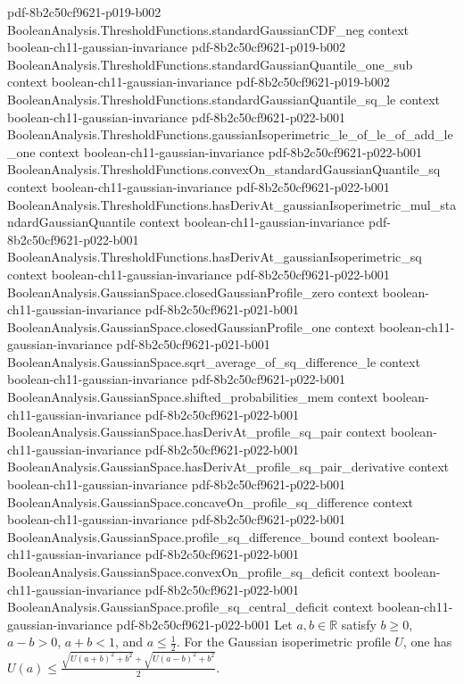 \begin{lemma}
  {pdf-8b2c50cf9621-p019-b002}
\proofstep
  {BooleanAnalysis.ThresholdFunctions.standardGaussianCDF_neg}
  {context}
  {boolean-ch11-gaussian-invariance}
  {pdf-8b2c50cf9621-p019-b002}
\proofstep
  {BooleanAnalysis.ThresholdFunctions.standardGaussianQuantile_one_sub}
  {context}
  {boolean-ch11-gaussian-invariance}
  {pdf-8b2c50cf9621-p019-b002}
\proofstep
  {BooleanAnalysis.ThresholdFunctions.standardGaussianQuantile_sq_le}
  {context}
  {boolean-ch11-gaussian-invariance}
  {pdf-8b2c50cf9621-p022-b001}
\proofstep
  {BooleanAnalysis.ThresholdFunctions.gaussianIsoperimetric_le_of_le_of_add_le_one}
  {context}
  {boolean-ch11-gaussian-invariance}
  {pdf-8b2c50cf9621-p022-b001}
\proofstep
  {BooleanAnalysis.ThresholdFunctions.convexOn_standardGaussianQuantile_sq}
  {context}
  {boolean-ch11-gaussian-invariance}
  {pdf-8b2c50cf9621-p022-b001}
\proofstep
  {BooleanAnalysis.ThresholdFunctions.hasDerivAt_gaussianIsoperimetric_mul_standardGaussianQuantile}
  {context}
  {boolean-ch11-gaussian-invariance}
  {pdf-8b2c50cf9621-p022-b001}
\proofstep
  {BooleanAnalysis.ThresholdFunctions.hasDerivAt_gaussianIsoperimetric_sq}
  {context}
  {boolean-ch11-gaussian-invariance}
  {pdf-8b2c50cf9621-p022-b001}
\proofstep
  {BooleanAnalysis.GaussianSpace.closedGaussianProfile_zero}
  {context}
  {boolean-ch11-gaussian-invariance}
  {pdf-8b2c50cf9621-p021-b001}
\proofstep
  {BooleanAnalysis.GaussianSpace.closedGaussianProfile_one}
  {context}
  {boolean-ch11-gaussian-invariance}
  {pdf-8b2c50cf9621-p021-b001}
\proofstep
  {BooleanAnalysis.GaussianSpace.sqrt_average_of_sq_difference_le}
  {context}
  {boolean-ch11-gaussian-invariance}
  {pdf-8b2c50cf9621-p022-b001}
\proofstep
  {BooleanAnalysis.GaussianSpace.shifted_probabilities_mem}
  {context}
  {boolean-ch11-gaussian-invariance}
  {pdf-8b2c50cf9621-p022-b001}
\proofstep
  {BooleanAnalysis.GaussianSpace.hasDerivAt_profile_sq_pair}
  {context}
  {boolean-ch11-gaussian-invariance}
  {pdf-8b2c50cf9621-p022-b001}
\proofstep
  {BooleanAnalysis.GaussianSpace.hasDerivAt_profile_sq_pair_derivative}
  {context}
  {boolean-ch11-gaussian-invariance}
  {pdf-8b2c50cf9621-p022-b001}
\proofstep
  {BooleanAnalysis.GaussianSpace.concaveOn_profile_sq_difference}
  {context}
  {boolean-ch11-gaussian-invariance}
  {pdf-8b2c50cf9621-p022-b001}
\proofstep
  {BooleanAnalysis.GaussianSpace.profile_sq_difference_bound}
  {context}
  {boolean-ch11-gaussian-invariance}
  {pdf-8b2c50cf9621-p022-b001}
\proofstep
  {BooleanAnalysis.GaussianSpace.convexOn_profile_sq_deficit}
  {context}
  {boolean-ch11-gaussian-invariance}
  {pdf-8b2c50cf9621-p022-b001}
\proofstep
  {BooleanAnalysis.GaussianSpace.profile_sq_central_deficit}
  {context}
  {boolean-ch11-gaussian-invariance}
  {pdf-8b2c50cf9621-p022-b001}
Let $a,b\in\mathbb R$ satisfy $b\ge0$, $a-b>0$, $a+b<1$, and $a\le\frac12$. For the
Gaussian isoperimetric profile $U$, one has
$U(a)\le\frac{\sqrt{U(a+b)^2+b^2}+\sqrt{U(a-b)^2+b^2}}{2}$.
\end{lemma}

